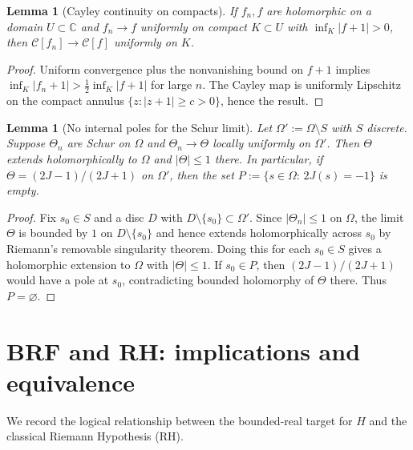 \documentclass[11pt]{article}
\newtheorem{lemma}[theorem]{Lemma}
\theoremstyle{remark}
\newcommand{\C}{\mathbb{C}}
\begin{document}
\begin{lemma}[Cayley continuity on compacts]\label{lem:cayley-cont}
If \(f_n,f\) are holomorphic on a domain \(U\subset\C\) and \(f_n\to f\) uniformly on compact \(K\subset U\) with \(\inf_{K}|f+1|>0\), then \(\mathcal C[f_n]\to\mathcal C[f]\) uniformly on \(K\).
\end{lemma}
\begin{proof}
Uniform convergence plus the nonvanishing bound on \(f+1\) implies \(\inf_{K}|f_n+1|>\tfrac12\inf_{K}|f+1|\) for large \(n\). The Cayley map is uniformly Lipschitz on the compact annulus \(\{z: |z+1|\ge c>0\}\), hence the result.
\end{proof}

\begin{lemma}[No internal poles for the Schur limit]\label{lem:no-P}
Let \(\Omega':=\Omega\setminus S\) with $S$ discrete. Suppose \(\Theta_n\) are Schur on \(\Omega\) and \(\Theta_n\to\Theta\) locally uniformly on \(\Omega'\). Then \(\Theta\) extends holomorphically to \(\Omega\) and \(|\Theta|\le 1\) there. In particular, if \(\Theta=(2J-1)/(2J+1)\) on \(\Omega'\), then the set \(P:=\{s\in\Omega:\,2J(s)=-1\}\) is empty.
\end{lemma}
\begin{proof}
Fix $s_0\in S$ and a disc $D$ with $D\setminus\{s_0\}\subset\Omega'$. Since $|\Theta_n|\le 1$ on $\Omega$, the limit $\Theta$ is bounded by $1$ on $D\setminus\{s_0\}$ and hence extends holomorphically across $s_0$ by Riemann's removable singularity theorem. Doing this for each $s_0\in S$ gives a holomorphic extension to $\Omega$ with $|\Theta|\le 1$. If $s_0\in P$, then $(2J-1)/(2J+1)$ would have a pole at $s_0$, contradicting bounded holomorphy of $\Theta$ there. Thus $P=\varnothing$.
\end{proof}

\section{BRF and RH: implications and equivalence}\label{sec:brf-rh}
We record the logical relationship between the bounded-real target for $H$ and the classical Riemann Hypothesis (RH).
\end{document}
